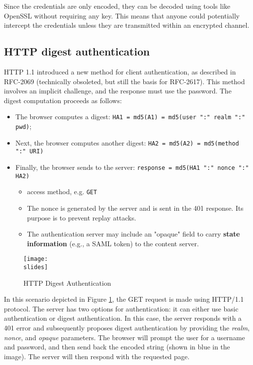 Since the credentials are only encoded, they can be decoded using tools like OpenSSL without requiring any key. This means that anyone could potentially intercept the credentials unless they are transmitted within an encrypted channel.

\subsection{HTTP digest authentication}
HTTP 1.1 introduced a new method for client authentication, as described in RFC-2069 (technically obsoleted, but still the basis for RFC-2617). This method involves an implicit challenge, and the response must use the password. The digest computation proceeds as follows:

\begin{itemize}
    \item The browser computes a digest:
    \texttt{HA1 = md5(A1) = md5(user ":" realm ":" pwd)};
    \item Next, the browser computes another digest: \texttt{HA2 = md5(A2) = md5(method ":" URI)}
    \item Finally, the browser sends to the server: \texttt{response = md5(HA1 ":" nonce ":" HA2)}
    \begin{itemize}
        \item access method, e.g. \texttt{GET}
    \end{itemize}
    \begin{itemize}
        \item The nonce is generated by the server and is sent in the 401 response. Its purpose is to prevent replay attacks.
        \item The authentication server may include an "opaque" field to carry \textbf{state information} (e.g., a SAML token) to the content server.
    \end{itemize}
\end{itemize}


\begin{figure}[h]
    \centering
    \texttt{[image: \\slides]}
    \caption{HTTP Digest Authentication}
    \label{fig:http-digest-authentication}
\end{figure}

In this scenario depicted in Figure \ref*{fig:http-digest-authentication}, the GET request is made using HTTP/1.1 protocol. The server has two options for authentication: it can either use basic authentication or digest authentication. In this case, the server responds with a 401 error and subsequently proposes digest authentication by providing the \textit{realm}, \textit{nonce}, and \textit{opaque} parameters. The browser will prompt the user for a username and password, and then send back the encoded string (shown in blue in the image). The server will then respond with the requested page.


